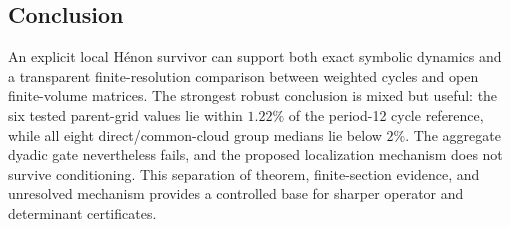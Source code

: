 \subsection{Conclusion}

An explicit local H\'enon survivor can support both exact symbolic dynamics and
a transparent finite-resolution comparison between weighted cycles and open
finite-volume matrices.  The strongest robust conclusion is mixed but useful:
the six tested parent-grid values lie within $1.22\%$ of the period-12 cycle
reference, while all eight direct/common-cloud group medians lie below $2\%$.
The aggregate dyadic gate nevertheless fails, and the proposed localization
mechanism does not survive conditioning.  This separation of theorem,
finite-section evidence, and unresolved mechanism provides a controlled base
for sharper operator and determinant certificates.
